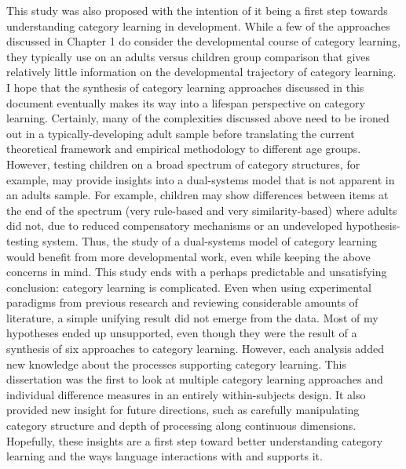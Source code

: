 \documentclass[../dissertation.tex]{subfiles}
\begin{document}
	This study was also proposed with the intention of it being a first step towards understanding category learning in development. While a few of the approaches discussed in Chapter 1 do consider the developmental course of category learning, they typically use on an adults versus children group comparison that gives relatively little information on the developmental trajectory of category learning. I hope that the synthesis of category learning approaches discussed in this document eventually makes its way into a lifespan perspective on category learning. Certainly, many of the complexities discussed above need to be ironed out in a typically-developing adult sample before translating the current theoretical framework and empirical methodology to different age groups. However, testing children on a broad spectrum of category structures, for example, may provide insights into a dual-systems model that is not apparent in an adults sample. For example, children may show differences between items at the end of the spectrum (very rule-based and very similarity-based) where adults did not, due to reduced compensatory mechanisms or an undeveloped hypothesis-testing system. Thus, the study of a dual-systems model of category learning would benefit from more developmental work, even while keeping the above concerns in mind.
	This study ends with a perhaps predictable and unsatisfying conclusion: category learning is complicated. Even when using experimental paradigms from previous research and reviewing considerable amounts of literature, a simple unifying result did not emerge from the data. Most of my hypotheses ended up unsupported, even though they were the result of a synthesis of six approaches to category learning. However, each analysis added new knowledge about the processes supporting category learning. This dissertation was the first to look at multiple category learning approaches and individual difference measures in an entirely within-subjects design. It also provided new insight for future directions, such as carefully manipulating category structure and depth of processing along continuous dimensions. Hopefully, these insights are a first step toward better understanding category learning and the ways language interactions with and supports it.
	
\end{document}

